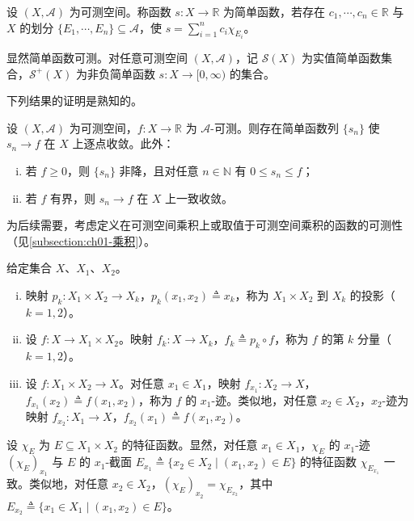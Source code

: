 \documentclass[../../main.tex]{subfiles}%
\begin{document}
\begin{definition}\label{definition:ch02-简单函数}
设 $(X,\mathscr A)$ 为可测空间。称函数 $s:X\to\mathbb R$ 为简单函数，若存在 $c_1,\cdots ,c_n\in\mathbb R$ 与 $X$ 的划分 $\{E_1,\cdots ,E_n\}\subseteq\mathscr A$，使 $s=\sum_{i=1}^n c_i\chi_{E_i}$。
\end{definition}

显然简单函数可测。对任意可测空间 $(X,\mathscr A)$，记 $\mathscr S(X)$ 为实值简单函数集合，$\mathscr S^+(X)$ 为非负简单函数 $s:X\to[0,\infty)$ 的集合。

下列结果的证明是熟知的。

\begin{theorem}\label{theorem:ch02-简单逼近}\label{theorem:ch02-简单函数逼近}
设 $(X,\mathscr A)$ 为可测空间，$f:X\to\mathbb R$ 为 $\mathscr A$-可测。则存在简单函数列 $\{s_n\}$ 使 $s_n\to f$ 在 $X$ 上逐点收敛。此外：
\begin{enumerate}[(i)]
\item 若 $f\geqslant0$，则 $\{s_n\}$ 非降，且对任意 $n\in\mathbb N$ 有 $0\leqslant s_n\leqslant f$；
\item 若 $f$ 有界，则 $s_n\to f$ 在 $X$ 上一致收敛。
\end{enumerate}
\end{theorem}

为后续需要，考虑定义在可测空间乘积上或取值于可测空间乘积的函数的可测性（见\cref{subsection:ch01-乘积}）。

\begin{definition}\label{definition:ch02-投影分量迹}
给定集合 $X$、$X_1$、$X_2$。
\begin{enumerate}[(i)]
\item 映射 $p_k:X_1\times X_2\to X_k$，$p_k(x_1,x_2)\triangleq x_k$，称为 $X_1\times X_2$ 到 $X_k$ 的投影（$k=1,2$）。
\item 设 $f:X\to X_1\times X_2$。映射 $f_k:X\to X_k$，$f_k\triangleq p_k\circ f$，称为 $f$ 的第 $k$ 分量（$k=1,2$）。
\item 设 $f:X_1\times X_2\to X$。对任意 $x_1\in X_1$，映射 $f_{x_1}:X_2\to X$，$f_{x_1}(x_2)\triangleq f(x_1,x_2)$，称为 $f$ 的 $x_1$-迹。类似地，对任意 $x_2\in X_2$，$x_2$-迹为映射 $f_{x_2}:X_1\to X$，$f_{x_2}(x_1)\triangleq f(x_1,x_2)$。
\end{enumerate}
\end{definition}

\begin{remark}\label{remark:ch02-特征函数截面}
\label{remark:ch02-截口}
设 $\chi_E$ 为 $E\subseteq X_1\times X_2$ 的特征函数。显然，对任意 $x_1\in X_1$，$\chi_E$ 的 $x_1$-迹 $(\chi_E)_{x_1}$ 与 $E$ 的 $x_1$-截面 $E_{x_1}\triangleq \{x_2\in X_2\mid(x_1,x_2)\in E\}$ 的特征函数 $\chi_{E_{x_1}}$ 一致。类似地，对任意 $x_2\in X_2$，$(\chi_E)_{x_2}=\chi_{E_{x_2}}$，其中 $E_{x_2}\triangleq \{x_1\in X_1\mid(x_1,x_2)\in E\}$。
\end{remark}
\end{document}
